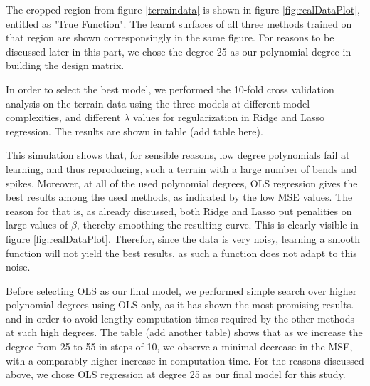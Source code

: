 \documentclass{article}
\begin{document}
The cropped region from figure \ref{terraindata} is shown in figure \ref{fig:realDataPlot}, entitled as "True Function". The learnt surfaces of all three methods trained on that region are shown corresponsingly in the same figure. For reasons to be discussed later in this part, we chose the degree 25 as our polynomial degree in building the design matrix.

In order to select the best model, we performed the 10-fold cross validation analysis on the terrain data using the three models at different model complexities, and different $\lambda$ values for regularization in Ridge and Lasso regression. The results are shown in table (add table here). 

This simulation shows that, for sensible reasons, low degree polynomials fail at learning, and thus reproducing, such a terrain with a large number of bends and spikes. Moreover, at all of the used polynomial degrees, OLS regression gives the best results among the used methods, as indicated by the low MSE values. The reason for that is, as already discussed, both Ridge and Lasso put penalities on large values of $\beta$, thereby smoothing the resulting curve. This is clearly visible in figure \ref{fig:realDataPlot}. Therefor, since the data is very noisy, learning a smooth function will not yield the best results, as such a function does not adapt to this noise.

Before selecting OLS as our final model, we performed simple search over higher polynomial degrees using OLS only, as it has shown the most promising results. and in order to avoid lengthy computation times required by the other methods at such high degrees. The table (add another table) shows that as we increase the degree from 25 to 55 in steps of 10, we observe a minimal decrease in the MSE, with a comparably higher increase in computation time. For the reasons discussed above, we chose OLS regression at degree 25 as our final model for this study.
\end{document}
